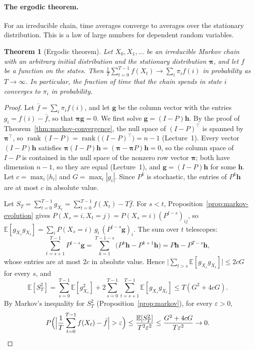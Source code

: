 \documentclass[11pt]{article}
\newcommand{\E}{\mathbb{E}}
\theoremstyle{definition}
\theoremstyle{plain}
\newtheorem{theorem}[definition]{Theorem}
\theoremstyle{remark}
\DeclareMathOperator{\rank}{rank}
\begin{document}
\paragraph{The ergodic theorem.} For an irreducible chain, time averages converge to averages over the stationary distribution. This is a law of large numbers for dependent random variables.

\begin{theorem}[Ergodic theorem]\label{thm:ergodic}
    Let $X_0, X_1, \ldots$ be an irreducible Markov chain with an arbitrary initial distribution and the stationary distribution $\boldsymbol{\pi}$, and let $f$ be a function on the states. Then $\frac{1}{T}\sum_{t=0}^{T-1} f(X_t) \to \sum_i \pi_i f(i)$ in probability as $T \to \infty$. In particular, the fraction of time that the chain spends in state $i$ converges to $\pi_i$ in probability.
\end{theorem}

\begin{proof}
    Let $\bar f = \sum_i \pi_i f(i)$, and let $\mathbf{g}$ be the column vector with the entries $g_i = f(i) - \bar f$, so that $\boldsymbol{\pi}\mathbf{g} = 0$. We first solve $\mathbf{g} = (I - P)\mathbf{h}$. By the proof of Theorem~\ref{thm:markov-convergence}, the null space of $(I - P)^\top$ is spanned by $\boldsymbol{\pi}^\top$, so $\rank(I - P) = \rank\big((I - P)^\top\big) = n - 1$ (Lecture~1). Every vector $(I - P)\mathbf{h}$ satisfies $\boldsymbol{\pi}(I - P)\mathbf{h} = (\boldsymbol{\pi} - \boldsymbol{\pi}P)\mathbf{h} = 0$, so the column space of $I - P$ is contained in the null space of the nonzero row vector $\boldsymbol{\pi}$; both have dimension $n - 1$, so they are equal (Lecture~1), and $\mathbf{g} = (I - P)\mathbf{h}$ for some $\mathbf{h}$. Let $c = \max_i |h_i|$ and $G = \max_i |g_i|$. Since $P^k$ is stochastic, the entries of $P^k\mathbf{h}$ are at most $c$ in absolute value.

    Let $S_T = \sum_{t=0}^{T-1} g_{X_t} = \sum_{t=0}^{T-1} f(X_t) - T\bar f$. For $s < t$, Proposition~\ref{prop:markov-evolution} gives $P(X_s = i, X_t = j) = P(X_s = i)(P^{t-s})_{ij}$, so $\E[g_{X_s}g_{X_t}] = \sum_i P(X_s = i)\,g_i\,(P^{t-s}\mathbf{g})_i$. The sum over $t$ telescopes:
    \[\sum_{t=s+1}^{T-1} P^{t-s}\mathbf{g} = \sum_{k=1}^{T-1-s} \big(P^k\mathbf{h} - P^{k+1}\mathbf{h}\big) = P\mathbf{h} - P^{T-s}\mathbf{h},\]
    whose entries are at most $2c$ in absolute value. Hence $\big|\sum_{t > s}\E[g_{X_s}g_{X_t}]\big| \leq 2cG$ for every $s$, and
    \[\E[S_T^2] = \sum_{s=0}^{T-1}\E[g_{X_s}^2] + 2\sum_{s=0}^{T-1}\sum_{t=s+1}^{T-1}\E[g_{X_s}g_{X_t}] \leq T(G^2 + 4cG).\]
    By Markov's inequality for $S_T^2$ (Proposition~\ref{prop:markov}), for every $\varepsilon > 0$,
    \[P\Big(\Big|\frac{1}{T}\sum_{t=0}^{T-1} f(X_t) - \bar f\Big| > \varepsilon\Big) \leq \frac{\E[S_T^2]}{T^2\varepsilon^2} \leq \frac{G^2 + 4cG}{T\varepsilon^2} \to 0. \qedhere\]
\end{proof}
\end{document}
